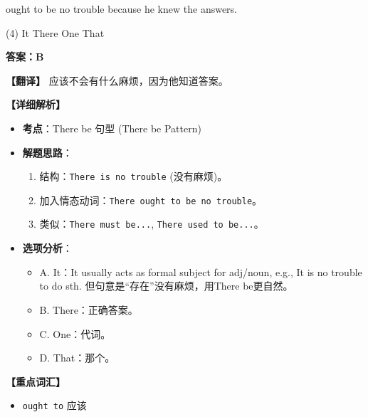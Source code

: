 \documentclass[11pt, a4paper]{article}
\newcommand{\analysis}[4]{
    \begin{solutionbox}
        \textbf{答案：#1}
        
        \textbf{【翻译】} #2
        
        \textbf{【详细解析】}
        #3
        
        \textbf{【重点词汇】}
        #4
    \end{solutionbox}
}
\newcommand{\blank}{\underline{\hspace{1.5cm}}}
\begin{document}
\begin{questions}
    \item \blank ought to be no trouble because he knew the answers.
    \begin{tasks}(4)
        \task It \task There \task One \task That
    \end{tasks}
    \analysis{B}{应该不会有什么麻烦，因为他知道答案。}{
        \begin{itemize}
            \item \textbf{考点}：There be 句型 (There be Pattern)
            \item \textbf{解题思路}：
                \begin{enumerate}
                    \item 结构：\texttt{There is no trouble} (没有麻烦)。
                    \item 加入情态动词：\texttt{There ought to be no trouble}。
                    \item 类似：\texttt{There must be...}, \texttt{There used to be...}。
                \end{enumerate}
            \item \textbf{选项分析}：
                \begin{itemize}
                    \item A. It：It usually acts as formal subject for adj/noun, e.g., It is no trouble to do sth. 但句意是“存在”没有麻烦，用There be更自然。
                    \item B. There：正确答案。
                    \item C. One：代词。
                    \item D. That：那个。
                \end{itemize}
        \end{itemize}
    }{
        \begin{itemize}
            \item \texttt{ought to} 应该
        \end{itemize}
    }


\end{questions}
\end{document}

